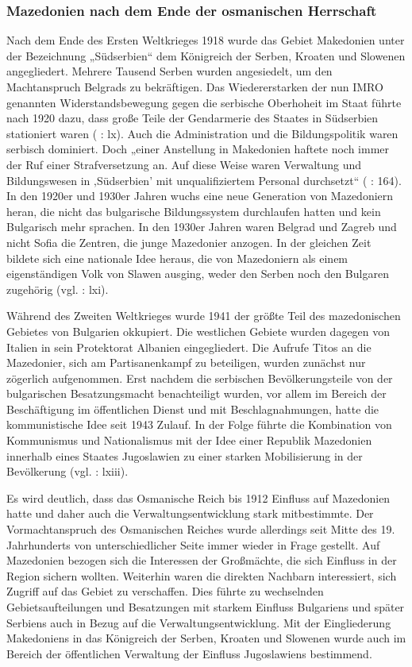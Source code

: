 \subsubsection{Mazedonien nach dem Ende der osmanischen Herrschaft }

Nach dem Ende des Ersten Weltkrieges 1918 wurde das Gebiet Makedonien unter der Bezeichnung „Südserbien“ dem Königreich der Serben, Kroaten und Slowenen angegliedert. Mehrere Tausend Serben wurden angesiedelt, um den Machtanspruch Belgrads zu bekräftigen. Das Wiedererstarken der nun IMRO genannten Widerstandsbewegung gegen die serbische Oberhoheit im Staat führte nach 1920 dazu, dass große Teile der Gendarmerie des Staates in Südserbien stationiert waren (\cite{bech09} :  lx). Auch die Administration und die Bildungspolitik waren serbisch dominiert. Doch „einer Anstellung in Makedonien haftete noch immer der Ruf einer Strafversetzung an. Auf diese Weise waren Verwaltung und Bildungswesen in ‚Südserbien’ mit unqualifiziertem Personal durchsetzt“ (\cite{opfer} : 164). In den 1920er und 1930er Jahren wuchs eine neue Generation von Mazedoniern heran, die nicht das bulgarische Bildungssystem durchlaufen hatten und kein Bulgarisch mehr sprachen. In den 1930er Jahren waren Belgrad und Zagreb und nicht Sofia die Zentren, die junge Mazedonier anzogen. In der gleichen Zeit bildete sich eine nationale Idee heraus, die von Mazedoniern als einem eigenständigen Volk von Slawen ausging, weder den Serben noch den Bulgaren zugehörig (vgl. \cite{bech09} : lxi).\par
Während des Zweiten Weltkrieges wurde 1941 der größte Teil des mazedonischen Gebietes von Bulgarien okkupiert. Die westlichen Gebiete wurden dagegen von Italien in sein Protektorat Albanien eingegliedert. Die Aufrufe Titos an die Mazedonier, sich am Partisanenkampf zu beteiligen, wurden zunächst nur zögerlich aufgenommen. Erst nachdem die serbischen Bevölkerungsteile von der bulgarischen Besatzungsmacht benachteiligt wurden, vor allem im Bereich der Beschäftigung im öffentlichen Dienst und mit Beschlagnahmungen, hatte die kommunistische Idee seit 1943 Zulauf. In der Folge führte die Kombination von Kommunismus und Nationalismus mit der Idee einer Republik Mazedonien innerhalb eines Staates Jugoslawien zu einer starken Mobilisierung in der Bevölkerung (vgl. \cite{bech09} : lxiii).\par
Es wird deutlich, dass das Osmanische Reich bis 1912 Einfluss auf Mazedonien hatte und daher auch die Verwaltungsentwicklung stark mitbestimmte. Der Vormachtanspruch des Osmanischen Reiches wurde allerdings seit Mitte des 19. Jahrhunderts von unterschiedlicher Seite immer wieder in Frage gestellt. Auf Mazedonien bezogen sich die Interessen der Großmächte, die sich Einfluss in der Region sichern wollten. Weiterhin waren die direkten Nachbarn interessiert, sich Zugriff auf das Gebiet zu verschaffen. Dies führte zu wechselnden Gebietsaufteilungen und Besatzungen mit starkem Einfluss Bulgariens und später Serbiens auch in Bezug auf die Verwaltungsentwicklung. Mit der Eingliederung Makedoniens in das Königreich der Serben, Kroaten und Slowenen wurde auch im Bereich der öffentlichen Verwaltung der Einfluss Jugoslawiens bestimmend.\par
